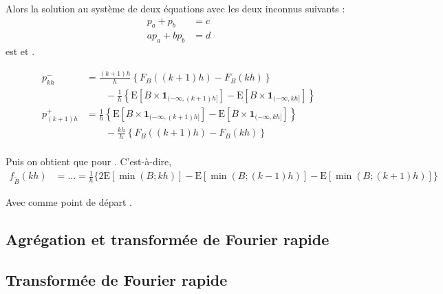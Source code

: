 \documentclass[10pt, french]{article}
\begin{document}
\begin{multicols*}{2}
\begin{definitionNOHFILLpropos}[Lemme]
Alors la solution au système de deux équations avec les deux inconnus suivants : 
\begin{align*}
	p_{a}	+	p_{b}	&=	c	\\
	ap_{a}	+	bp_{b}	&=	d
\end{align*}
est  et .
\end{definitionNOHFILLpropos}

\begin{definitionNOHFILLprop}
\setlength{\mathindent}{-1cm}
\begin{align*}
	p^{-}_{kh}
	&=	\frac{(k + 1)h}{h} \left\{
			F_{B}((k + 1)h)	-	F_{B}(kh)
		\right\}		\\	&\quad\quad	-	\frac{1}{h} \left\{
			\text{E}[B \times \bm{1}_{(-\infty, (k + 1)h]}]	-	\text{E}[B \times \bm{1}_{(-\infty, kh]}]	
		\right\}	\\
	p^{+}_{(k + 1)h}
	&=	\frac{1}{h} \left\{
			\text{E}[B \times \bm{1}_{(-\infty, (k + 1)h]}]	-	\text{E}[B \times \bm{1}_{(-\infty, kh]}]
		\right\}			\\	&\quad\quad -\frac{kh}{h} \left\{
			F_{B}((k + 1)h)	-	F_{B}(kh)
		\right\}		\\
\end{align*}

Puis on obtient que pour  . C'est-à-dire, 
\begin{align*}
	f_{\tilde{B}}(kh)
	&=	...
	=	\frac{1}{h}	\bigg\{
		2\text{E}[\min(B; kh)]	-	\text{E}[\min(B; (k - 1)h)]		-	\text{E}[\min(B; (k + 1)h)]	
		\bigg\}
\end{align*}
\setlength{\mathindent}{1cm}

Avec comme point de départ .

\end{definitionNOHFILLprop}

\columnbreak
\subsection{Agrégation et transformée de Fourier rapide}


\columnbreak
\subsection{Transformée de Fourier rapide}



\end{multicols*}
\end{document}

